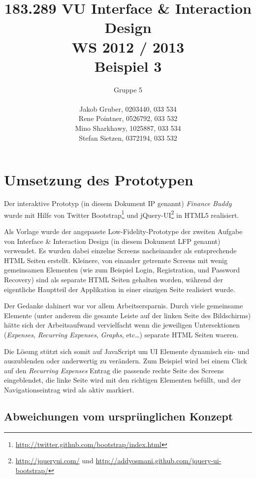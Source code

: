 \documentclass[a4paper,10pt]{article}
\title{
    183.289 VU Interface \& Interaction Design \\
    WS 2012 / 2013 \\
    Beispiel 3}
\author{
    Gruppe 5 \\ \\
    Jakob Gruber, 0203440, 033 534 \\
    Rene Pointner, 0526792, 033 532\\
    Mino Sharkhawy, 1025887, 033 534 \\
    Stefan Sietzen, 0372194, 033 532}
\begin{document}
\maketitle

\clearpage
\tableofcontents

\clearpage
\section{Umsetzung des Prototypen}

Der interaktive Prototyp (in diesem Dokument IP genannt) \emph{Finance Buddy} wurde mit Hilfe von Twitter
Bootstrap\footnote{\url{http://twitter.github.com/bootstrap/index.html}}
und jQuery-UI\footnote{\url{http://jqueryui.com/} und
\url{http://addyosmani.github.com/jquery-ui-bootstrap/}} in HTML5 realisiert.

Als Vorlage wurde der angepasste Low-Fidelity-Prototype der zweiten Aufgabe von Interface \&
Interaction Design (in diesem Dokument LFP genannt) verwendet. Es wurden dabei einzelne Screens nacheinander als
entsprechende HTML Seiten erstellt. Kleinere, von einander getrennte Screens mit
wenig gemeinsamen Elementen (wie zum Beispiel Login, Registration, und Password Recovery)
sind als separate HTML Seiten gehalten worden, w\"ahrend der eigentliche Hauptteil
der Applikation in einer einzigen Seite realisiert wurde.

Der Gedanke dahinert war vor allem Arbeitsersparnis. Durch viele gemeinsame Elemente (unter
anderem die gesamte Leiste auf der linken Seite des Bildschirms) h\"atte sich der
Arbeitsaufwand vervielfacht wenn die jeweiligen Untersektionen (\emph{Expenses},
\emph{Recurring Expenses}, \emph{Graphs}, etc\ldots) separate HTML Seiten waeren.

Die L\"osung st\"utzt sich somit auf JavaScript um UI Elemente dynamisch ein- und
auszublenden oder anderwertig zu ver\"andern. Zum Beispiel wird bei einem Click auf
den \emph{Recurring Expenses} Entrag die passende rechte Seite des Screens eingeblendet,
die linke Seite wird mit den richtigen Elementen bef\"ullt, und der Navigationseintrag
wird als aktiv markiert.

\subsection{Abweichungen vom urspr\"unglichen Konzept}
\end{document}
